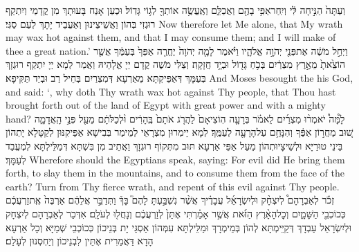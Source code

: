 {וְעַתָּה֙ הַנִּ֣יחָה לִּ֔י וְיִֽחַר\maqqaf אַפִּ֥י בָהֶ֖ם וַאֲכַלֵּ֑ם וְאֶֽעֱשֶׂ֥ה אוֹתְךָ֖ לְג֥וֹי גָּדֽוֹל׃}
{וּכְעַן אָנַח בָּעוּתָךְ מִן קֳדָמַי וְיִתְקַף רוּגְזִי בְּהוֹן וַאֲשֵׁיצֵינוּן וְאַעֲבֵיד יָתָךְ לְעַם סַגִּי׃}
{Now therefore let Me alone, that My wrath may wax hot against them, and that I may consume them; and I will make of thee a great nation.’}{}
{וַיְחַ֣ל מֹשֶׁ֔ה אֶת\maqqaf פְּנֵ֖י יְהֹוָ֣ה אֱלֹהָ֑יו וַיֹּ֗אמֶר לָמָ֤ה יְהֹוָה֙ יֶחֱרֶ֤ה אַפְּךָ֙ בְּעַמֶּ֔ךָ אֲשֶׁ֤ר הוֹצֵ֙אתָ֙ מֵאֶ֣רֶץ מִצְרַ֔יִם בְּכֹ֥חַ גָּד֖וֹל וּבְיָ֥ד חֲזָקָֽה׃}
{וְצַלִּי מֹשֶׁה קֳדָם יְיָ אֱלָהֵיהּ וַאֲמַר לְמָא יְיָ יִתְקַף רוּגְזָךְ בְּעַמָּךְ דְּאַפֵּיקְתָּא מֵאַרְעָא דְּמִצְרַיִם בְּחֵיל רַב וּבְיַד תַּקִּיפָא׃}
{And Moses besought the \lord\space his God, and said: ‘\lord, why doth Thy wrath wax hot against Thy people, that Thou hast brought forth out of the land of Egypt with great power and with a mighty hand?}{}
{לָ֩מָּה֩ יֹאמְר֨וּ מִצְרַ֜יִם לֵאמֹ֗ר בְּרָעָ֤ה הֽוֹצִיאָם֙ לַהֲרֹ֤ג אֹתָם֙ בֶּֽהָרִ֔ים וּ֨לְכַלֹּתָ֔ם מֵעַ֖ל פְּנֵ֣י הָֽאֲדָמָ֑ה שׁ֚וּב מֵחֲר֣וֹן אַפֶּ֔ךָ וְהִנָּחֵ֥ם עַל\maqqaf הָרָעָ֖ה לְעַמֶּֽךָ׃}
{לְמָא יֵימְרוּן מִצְרָאֵי לְמֵימַר בְּבִישָׁא אַפֵּיקִנּוּן לְקַטָּלָא יָתְהוֹן בֵּינֵי טוּרַיָּא וּלְשֵׁיצָיוּתְהוֹן מֵעַל אַפֵּי אַרְעָא תּוּב מִתְּקוֹף רוּגְזָךְ וַאֲתֵיב מִן בִּשְׁתָּא דְּמַלֵּילְתָּא לְמֶעֱבַד לְעַמָּךְ׃}
{Wherefore should the Egyptians speak, saying: For evil did He bring them forth, to slay them in the mountains, and to consume them from the face of the earth? Turn from Thy fierce wrath, and repent of this evil against Thy people.}{}
{זְכֹ֡ר לְאַבְרָהָם֩ לְיִצְחָ֨ק וּלְיִשְׂרָאֵ֜ל עֲבָדֶ֗יךָ אֲשֶׁ֨ר נִשְׁבַּ֣עְתָּ לָהֶם֮ בָּךְ֒ וַתְּדַבֵּ֣ר אֲלֵהֶ֔ם אַרְבֶּה֙ אֶֽת\maqqaf זַרְעֲכֶ֔ם כְּכוֹכְבֵ֖י הַשָּׁמָ֑יִם וְכׇל\maqqaf הָאָ֨רֶץ הַזֹּ֜את אֲשֶׁ֣ר אָמַ֗רְתִּי אֶתֵּן֙ לְזַרְעֲכֶ֔ם וְנָחֲל֖וּ לְעֹלָֽם׃}
{אִדְּכַר לְאַבְרָהָם לְיִצְחָק וּלְיִשְׂרָאֵל עַבְדָךְ דְּקַיֵּימְתָּא לְהוֹן בְּמֵימְרָךְ וּמַלֵּילְתָּא עִמְּהוֹן אַסְגֵּי יָת בְּנֵיכוֹן כְּכוֹכְבֵי שְׁמַיָּא וְכָל אַרְעָא הָדָא דַּאֲמַרִית אֶתֵּין לִבְנֵיכוֹן וְיַחְסְנוּן לְעָלַם׃}
